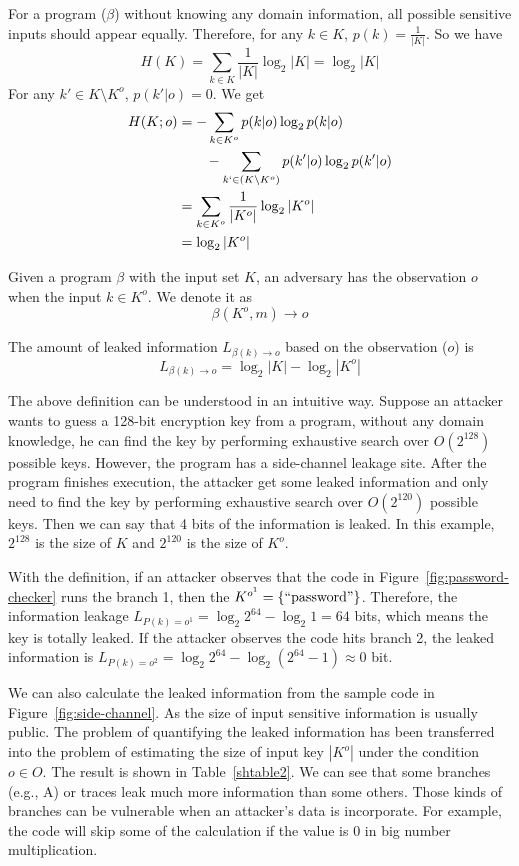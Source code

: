For a program ($\beta$) without knowing any domain information, all possible sensitive
inputs should appear equally. Therefore, for any $k \in K$, $p(k) =
\frac{1}{|K|}$. So we have
$$H(K) = \sum_{k {\in} K}\frac{1}{|K|}\log_2{|K|} = \log_2{|K|}$$
For any $k' \in K \setminus K^o$, $p(k'|o) = 0$. We get
\begin{align*}
    H(K;o) & = - \sum_{k {\in} K^o}{p(k|o)\log_2p(k|o)}                         \\
           & \qquad   - \sum_{k` {\in} (K \setminus K^o)}{p(k'|o)\log_2p(k'|o)} \\
           & = \sum_{k {\in} K^o}\frac{1}{|K^o|}\log_2{|K^o|}                   \\
           & = \log_2{|K^o|}
\end{align*}


\begin{mydef}
    \label{def}
    Given a program $\beta$ with the input set $K$,
    an adversary has the observation $o$ when the input $k{\in}K^o$.
    We denote it as
    $$\beta(K^o, m) \rightarrow	o$$

    The amount of leaked information $L_{\beta(k)\rightarrow o}$ based on the observation ($o$) is
    $$L_{\beta(k)\rightarrow o} = \log_2{|K|} - \log_2{|K^o|}$$
\end{mydef}

The above definition can be understood in an intuitive way. Suppose an attacker
wants to guess a 128-bit encryption key from a program,
without any domain knowledge, 
he can find the key by performing exhaustive search over $O(2^{128})$ possible keys. 
However, the program has a side-channel leakage site. After the program finishes execution, the
attacker get some leaked information and only need to find the key by performing 
exhaustive search over $O(2^{120})$ possible keys. Then we can say that 4 bits of the information
is leaked. In this example, $2^{128}$ is the size of $K$ and $2^{120}$ is the size of $K^o$.


With the definition, if an attacker observes that the code in
Figure~\ref{fig:password-checker} runs the branch 1, then the $K^{o^{1}} =
\{\mathrm{``password"}\}$. Therefore, the information leakage $L_{P(k)=o^{1}} =
\log_2{2^{64}} - \log_2{1} = 64$ bits, which means the key is totally leaked. If
the attacker observes the code hits branch 2, the leaked information is
$L_{P(k)=o^{2}} = \log_2{2^{64}} - \log_2{(2^{64}-1)} \approx 0$ bit.


We can also calculate the leaked information from the sample code in
Figure~\ref{fig:side-channel}. As the size of input sensitive information is
usually public. The problem of quantifying the leaked information has been
transferred into the problem of estimating the size of input key $|K^o|$ under
the condition $o \in O$. The result is shown in Table~\ref{shtable2}. We can see
that some branches (e.g., A) or traces leak much more information than some others. 
Those kinds of branches can be vulnerable when an attacker's data is incorporate. 
For example, the code will skip some of the calculation if the value is 0 in big 
number multiplication.

